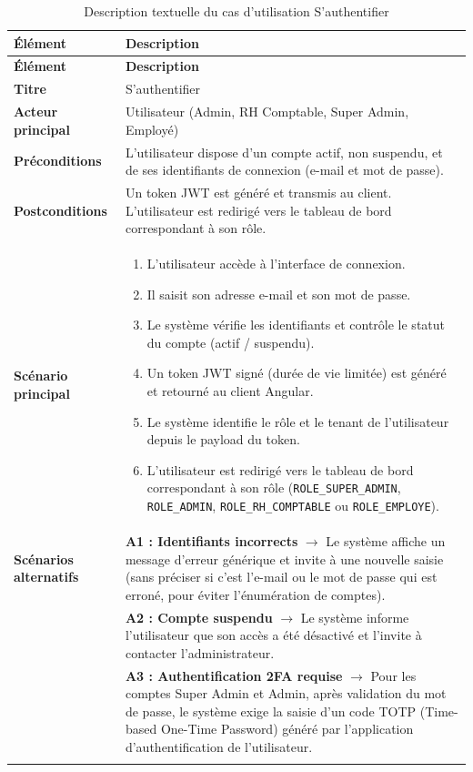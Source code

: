 \vspace{0.2cm}
\begin{xltabular}{\textwidth}{|l|X|}
    \hline
     \textbf{Élément} & \textbf{Description} \\ \hline
    \endfirsthead
    \hline
     \textbf{Élément} & \textbf{Description} \\ \hline
    \endhead
    \hline
    \endfoot
    \endfoot
    \endlastfoot
    \textbf{Titre} & S'authentifier \\ \hline
    \textbf{Acteur principal} & Utilisateur (Admin, RH Comptable, Super Admin, Employé) \\ \hline
    \textbf{Préconditions} & L'utilisateur dispose d'un compte actif, non suspendu, 
    et de ses identifiants de connexion (e-mail et mot de passe). \\ \hline
    \textbf{Postconditions} & Un token JWT est généré et transmis au client. 
    L'utilisateur est redirigé vers le tableau de bord correspondant à son rôle. \\ \hline
    \textbf{Scénario principal} &
    \begin{enumerate}[nosep, leftmargin=*]
        \item L'utilisateur accède à l'interface de connexion.
        \item Il saisit son adresse e-mail et son mot de passe.
        \item Le système vérifie les identifiants et contrôle le statut du compte 
              (actif / suspendu).
        \item Un token JWT signé (durée de vie limitée) est généré et retourné 
              au client Angular.
        \item Le système identifie le rôle et le tenant de l'utilisateur depuis 
              le payload du token.
        \item L'utilisateur est redirigé vers le tableau de bord correspondant 
              à son rôle (\texttt{ROLE\_SUPER\_ADMIN}, \texttt{ROLE\_ADMIN}, 
              \texttt{ROLE\_RH\_COMPTABLE} ou \texttt{ROLE\_EMPLOYE}).
    \end{enumerate} \\ \hline
    \textbf{Scénarios alternatifs}
    & \textbf{A1 : Identifiants incorrects} $\rightarrow$ Le système affiche un 
      message d'erreur générique et invite à une nouvelle saisie (sans préciser 
      si c'est l'e-mail ou le mot de passe qui est erroné, pour éviter 
      l'énumération de comptes). \\ 
    & \textbf{A2 : Compte suspendu} $\rightarrow$ Le système informe l'utilisateur 
      que son accès a été désactivé et l'invite à contacter l'administrateur. \\ 
    & \textbf{A3 : Authentification 2FA requise} $\rightarrow$ Pour les comptes 
      Super Admin et Admin, après validation du mot de passe, le système exige 
      la saisie d'un code TOTP (Time-based One-Time Password) généré par 
      l'application d'authentification de l'utilisateur. \\ \hline
      \caption{Description textuelle du cas d'utilisation S'authentifier}
    \label{tab:uc_authentification}
\end{xltabular}


